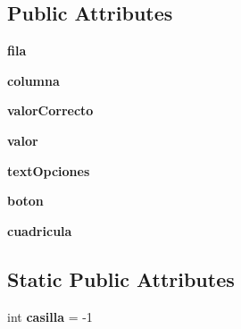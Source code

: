 \subsection*{Public Attributes}
\begin{DoxyCompactItemize}
\item 
\hypertarget{class_numero_1_1_numero_add58c510e6dfea0d3c3692c79e7c249a}{{\bfseries fila}}\label{class_numero_1_1_numero_add58c510e6dfea0d3c3692c79e7c249a}

\item 
\hypertarget{class_numero_1_1_numero_a4efc6e94fb89bf311c713fcda7fd7fac}{{\bfseries columna}}\label{class_numero_1_1_numero_a4efc6e94fb89bf311c713fcda7fd7fac}

\item 
\hypertarget{class_numero_1_1_numero_a9b4f5e3b0d3fa36ab48a1b25bc915b03}{{\bfseries valor\-Correcto}}\label{class_numero_1_1_numero_a9b4f5e3b0d3fa36ab48a1b25bc915b03}

\item 
\hypertarget{class_numero_1_1_numero_a79d57b9de0112d09194bff4aa2558fd8}{{\bfseries valor}}\label{class_numero_1_1_numero_a79d57b9de0112d09194bff4aa2558fd8}

\item 
\hypertarget{class_numero_1_1_numero_ab0d5b31bbf9e6ec1f8497bbf03ed68bf}{{\bfseries text\-Opciones}}\label{class_numero_1_1_numero_ab0d5b31bbf9e6ec1f8497bbf03ed68bf}

\item 
\hypertarget{class_numero_1_1_numero_aef53c5ef68a40f343af7a12d4fde21a0}{{\bfseries boton}}\label{class_numero_1_1_numero_aef53c5ef68a40f343af7a12d4fde21a0}

\item 
\hypertarget{class_numero_1_1_numero_a7a97cb3e4252e08aa77949a4aa616548}{{\bfseries cuadricula}}\label{class_numero_1_1_numero_a7a97cb3e4252e08aa77949a4aa616548}

\end{DoxyCompactItemize}
\subsection*{Static Public Attributes}
\begin{DoxyCompactItemize}
\item 
\hypertarget{class_numero_1_1_numero_a47b615282708c7153fce5360d06082ec}{int {\bfseries casilla} = -\/1}\label{class_numero_1_1_numero_a47b615282708c7153fce5360d06082ec}

\end{DoxyCompactItemize}


